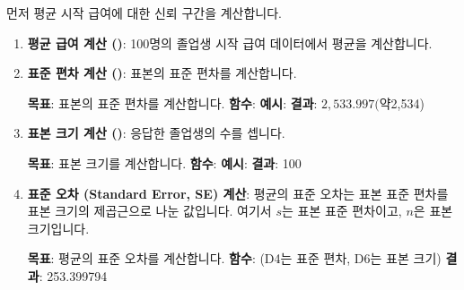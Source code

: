 \documentclass[11pt,a4paper]{article}
\begin{document}
\begin{enumerate}
\begin{enumerate}
먼저 평균 시작 급여에 대한 신뢰 구간을 계산합니다.

\begin{enumerate}
    \item \textbf{평균 급여 계산 ()}:
    100명의 졸업생 시작 급여 데이터에서 평균을 계산합니다.

    \item \textbf{표준 편차 계산 ()}:
    표본의 표준 편차를 계산합니다.
    \begin{tcolorbox}[title=Excel STDEV.S 함수 사용법, mybox]
        \textbf{목표}: 표본의 표준 편차를 계산합니다.
        \textbf{함수}: 
        \textbf{예시}: 
        \textbf{결과}: $2,533.997 (약 $2,534)
    \end{tcolorbox}

    \item \textbf{표본 크기 계산 ()}:
    응답한 졸업생의 수를 셉니다.
    \begin{tcolorbox}[title=Excel COUNT 함수 사용법, mybox]
        \textbf{목표}: 표본 크기를 계산합니다.
        \textbf{함수}: 
        \textbf{예시}: 
        \textbf{결과}: 100
    \end{tcolorbox}

    \item \textbf{표준 오차 (Standard Error, SE) 계산}:
    평균의 표준 오차는 표본 표준 편차를 표본 크기의 제곱근으로 나눈 값입니다.
    여기서 $s$는 표본 표준 편차이고, $n$은 표본 크기입니다.
    \begin{tcolorbox}[title=Excel 표준 오차 계산, mybox]
        \textbf{목표}: 평균의 표준 오차를 계산합니다.
        \textbf{함수}:  (D4는 표준 편차, D6는 표본 크기)
        \textbf{결과}: 253.399794
    \end{tcolorbox}


\end{enumerate}
\end{enumerate}
\end{enumerate}
\end{document}
